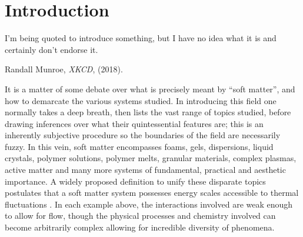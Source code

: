 \documentclass[11pt,twoside]{report}
\begin{document}
\chapter{Introduction}
\epigraph{I'm being quoted to introduce something, but I have no idea what it is and certainly don't endorse it.}{Randall Munroe, \emph{XKCD}, (2018).}

It is a matter of some debate over what is precisely meant by ``soft matter'', and how to demarcate the various systems studied.
In introducing this field one normally takes a deep breath, then lists the vast range of topics studied, before drawing inferences over what their quintessential features are; this is an inherently subjective procedure so the boundaries of the field are necessarily fuzzy.
In this vein, soft matter encompasses foams, gels, dispersions, liquid crystals, polymer solutions, polymer melts, granular materials, complex plasmas, active matter and many more systems of fundamental, practical and aesthetic importance.
A widely proposed definition to unify these disparate topics postulates that a soft matter system possesses energy scales accessible to thermal fluctuations \cite{LubenskySSC1997}.
In each example above, the interactions involved are weak enough to allow for flow, though the physical processes and chemistry involved can become arbitrarily complex allowing for incredible diversity of phenomena.
\end{document}
